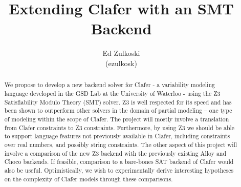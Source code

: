 \documentclass{article}
\begin{document}
\newenvironment{myenumerate}{%
  \edef\backupindent{\the\parindent}%
  \itemize%
  \setlength{\parindent}{\backupindent}%
}{\endenumerate}

\title{Extending Clafer with an SMT Backend}	
\author{Ed Zulkoski \\
(ezulkosk)}

\maketitle
\begin{abstract}
We propose to develop a new backend solver for Clafer - a variability modeling language developed in the GSD Lab at the University of Waterloo - using the Z3 Satisfiability Modulo Theory (SMT) solver. Z3 is well respected for its speed and has been shown to outperform other solvers in the domain of partial modeling -- one type of modeling within the scope of Clafer. The project will mostly involve a translation from Clafer constraints to Z3 constraints. Furthermore, by using Z3 we should be able to support language features not previously available in Clafer, including constraints over real numbers, and possibly string constraints. The other aspect of this project will involve a comparison of the new Z3 backend with the previously existing Alloy and Choco backends. If feasible, comparison to a bare-bones SAT backend of Clafer would also be useful. Optimistically, we wish to experimentally derive interesting hypotheses on the complexity of Clafer models through these comparisons. 
\end{abstract}
\end{document}
